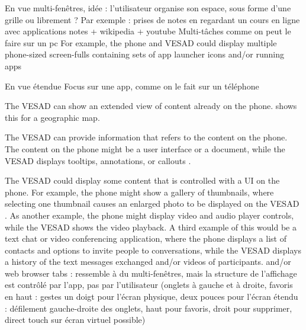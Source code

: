 En vue multi-fenêtres, idée : l'utilisateur organise son espace, sous forme d'une grille ou librement ?
Par exemple : prises de notes en regardant un cours en ligne avec applications notes + wikipedia + youtube
Multi-tâches comme on peut le faire sur un pc
For example, the phone and VESAD could display multiple phone-sized screen-fulls containing sets of app launcher icons and/or running apps 


En vue étendue
Focus sur une app, comme on le fait sur un téléphone

The VESAD can show an extended view of content already on the phone.  shows this for a geographic map.

The VESAD can provide information that refers to the content on the phone. The content on the phone might be a user interface or a document, while the VESAD displays tooltips, annotations, or callouts .

The VESAD could display some content that is controlled with a UI on the phone. For example, the phone might show a gallery of thumbnails, where selecting one thumbnail causes an enlarged photo to be displayed on the VESAD . As another example, the phone might display video and audio player controls, while the VESAD shows the video playback. A third example of this would be a text chat or video conferencing application, where the phone displays a list of contacts and options to invite people to conversations, while the VESAD displays a history of the text messages exchanged and/or videos of participants.
and/or web browser tabs : ressemble à du multi-fenêtres, mais la structure de l'affichage est contrôlé par l'app, pas par l'utilisateur (onglets à gauche et à droite, favoris en haut : gestes un doigt pour l'écran physique, deux pouces pour l'écran étendu : défilement gauche-droite des onglets, haut pour favoris, droit pour supprimer, direct touch sur écran virtuel possible)

